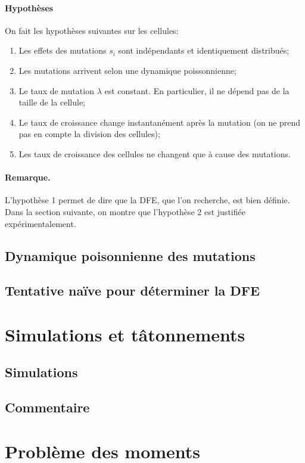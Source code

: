 \documentclass[12pt]{article}
\newcommand{\req}[1]{\paragraph{Remarque.}#1\vspace{0.1cm}}
\begin{document}
\paragraph{Hypothèses}
On fait les hypothèses suivantes sur les cellules:
\begin{enumerate}
\item Les effets des mutations $s_i$ sont indépendants et identiquement distribués;
\item Les mutations arrivent selon une dynamique poissonnienne;
\item Le taux de mutation $\lambda$ est constant. En particulier, il ne dépend pas de la taille de la cellule;
\item Le taux de croissance change instantanément après la mutation (on ne prend pas en compte la division des cellules);
\item Les taux de croissance des cellules ne changent que à cause des mutations.
\end{enumerate}

\req{L'hypothèse 1 permet de dire que la DFE, que l'on recherche, est bien définie. Dans la section suivante, on montre que l'hypothèse 2 est justifiée expérimentalement.}

\subsection{Dynamique poisonnienne des mutations}


\subsection{Tentative naïve pour déterminer la DFE}




\section{Simulations et tâtonnements}

\subsection{Simulations}

\subsection{Commentaire}


\section{Problème des moments}
\end{document}
